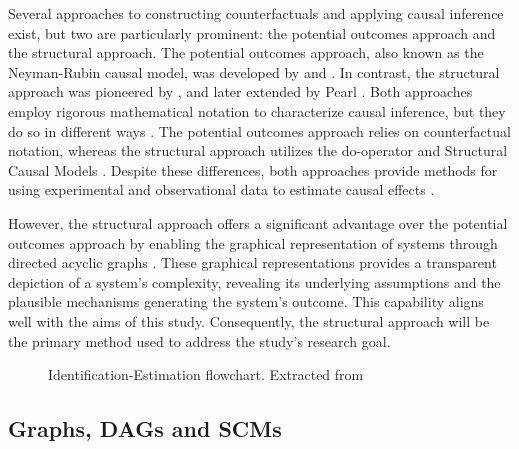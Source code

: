 \documentclass[
  authoryear,
  preprint,
  1p]{elsarticle}
\begin{document}
Several approaches to constructing counterfactuals and applying causal
inference exist, but two are particularly prominent: the potential
outcomes approach and the structural approach. The potential outcomes
approach, also known as the Neyman-Rubin causal model, was developed by
\citet{Neyman_et_al_1990} and \citet{Rubin_1974}. In contrast, the
structural approach was pioneered by \citet{Wright_1921}, and later
extended by Pearl \citep{Pearl_2009, Pearl_et_al_2016}. Both approaches
employ rigorous mathematical notation to characterize causal inference,
but they do so in different ways \citep{Neal_2020}. The potential
outcomes approach relies on counterfactual notation, whereas the
structural approach utilizes the do-operator and Structural Causal
Models \citep[SCM,][]{Pearl_2009, Pearl_et_al_2016}. Despite these
differences, both approaches provide methods for using experimental and
observational data to estimate causal effects \citep{Pearl_2010}.

However, the structural approach offers a significant advantage over the
potential outcomes approach by enabling the graphical representation of
systems through directed acyclic graphs
\citep[DAG,][]{Gross_et_al_2018, Neal_2020}. These graphical
representations provides a transparent depiction of a system's
complexity, revealing its underlying assumptions and the plausible
mechanisms generating the system's outcome. This capability aligns well
with the aims of this study. Consequently, the structural approach will
be the primary method used to address the study's research goal.

\begin{figure}


\caption{\label{fig-IEflow}Identification-Estimation flowchart.
Extracted from \citet[32]{Neal_2020}}

\end{figure}%

\subsection{Graphs, DAGs and SCMs}\label{sec-prelim-graphs}
\end{document}
